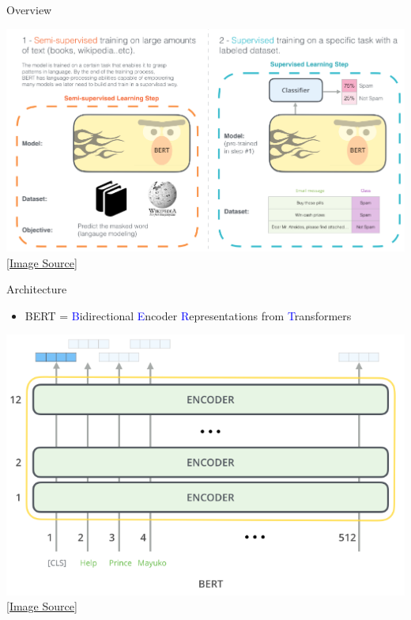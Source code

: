 \begin{frame}[fragile]{Overview}

    \begin{center}
        \includegraphics[scale=0.3]{../images/img_8.png} \\
        \href{http://jalammar.github.io/illustrated-bert/}{[Image Source]}
    \end{center}

\end{frame}

\begin{frame}[fragile]{Architecture}

    \begin{itemize}
        \item BERT = \textcolor{blue}{B}idirectional \textcolor{blue}{E}ncoder \textcolor{blue}{R}epresentations from \textcolor{blue}{T}ransformers
    \end{itemize}

    \begin{center}
        \includegraphics[scale=0.3]{../images/img_9.png} \\
        \href{http://jalammar.github.io/illustrated-bert/}{[Image Source]}
    \end{center}

\end{frame}

